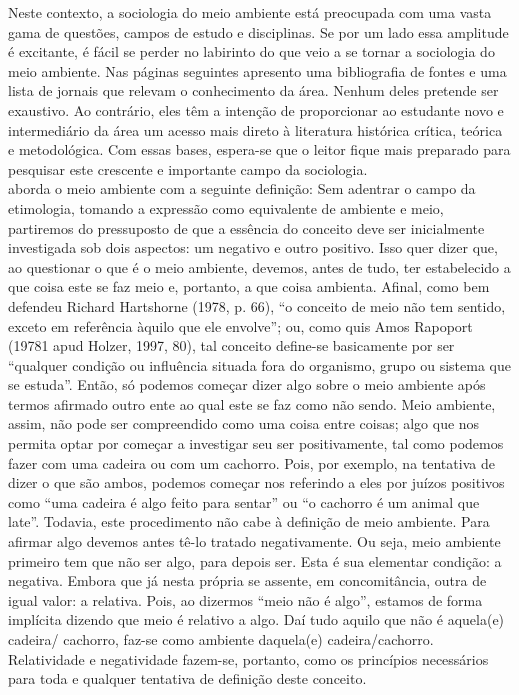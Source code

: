 Neste contexto, a sociologia do meio ambiente está preocupada com uma vasta gama de questões, campos de estudo e disciplinas. Se por um lado essa amplitude é excitante, é fácil se perder no labirinto do que veio a se tornar a sociologia do meio ambiente. Nas páginas seguintes apresento uma bibliografia de fontes e uma lista de jornais que relevam o conhecimento da área. Nenhum deles pretende ser exaustivo. Ao contrário, eles têm a intenção de proporcionar ao estudante novo e intermediário da área um acesso mais direto à literatura histórica crítica, teórica e metodológica. Com essas bases, espera-se que o leitor fique mais preparado para pesquisar este crescente e importante campo da sociologia.\\

 aborda o meio ambiente com a seguinte definição:
Sem adentrar o campo da etimologia, tomando a expressão como equivalente de
ambiente e meio, partiremos do pressuposto de que a essência do conceito deve ser inicialmente
investigada sob dois aspectos: um negativo e outro positivo. Isso quer dizer que, ao
questionar o que é o meio ambiente, devemos, antes de tudo, ter estabelecido a que coisa
este se faz meio e, portanto, a que coisa ambienta. Afinal, como bem defendeu Richard
Hartshorne (1978, p. 66), “o conceito de meio não tem sentido, exceto em referência
àquilo que ele envolve”; ou, como quis Amos Rapoport (19781 apud Holzer, 1997, 80), tal
conceito define-se basicamente por ser “qualquer condição ou influência situada fora do
organismo, grupo ou sistema que se estuda”. Então, só podemos começar dizer algo sobre
o meio ambiente após termos afirmado outro ente ao qual este se faz como não sendo.
Meio ambiente, assim, não pode ser compreendido como uma coisa entre coisas; algo que
nos permita optar por começar a investigar seu ser positivamente, tal como podemos fazer
com uma cadeira ou com um cachorro. Pois, por exemplo, na tentativa de dizer o que são ambos, podemos começar nos referindo a eles por juízos positivos como “uma cadeira é
algo feito para sentar” ou “o cachorro é um animal que late”. Todavia, este procedimento
não cabe à definição de meio ambiente. Para afirmar algo devemos antes tê-lo tratado negativamente.
Ou seja, meio ambiente primeiro tem que não ser algo, para depois ser. Esta
é sua elementar condição: a negativa. Embora que já nesta própria se assente, em concomitância,
outra de igual valor: a relativa. Pois, ao dizermos “meio não é algo”, estamos de
forma implícita dizendo que meio é relativo a algo. Daí tudo aquilo que não é aquela(e) cadeira/
cachorro, faz-se como ambiente daquela(e) cadeira/cachorro. Relatividade e negatividade
fazem-se, portanto, como os princípios necessários para toda e qualquer tentativa
de definição deste conceito.\\

